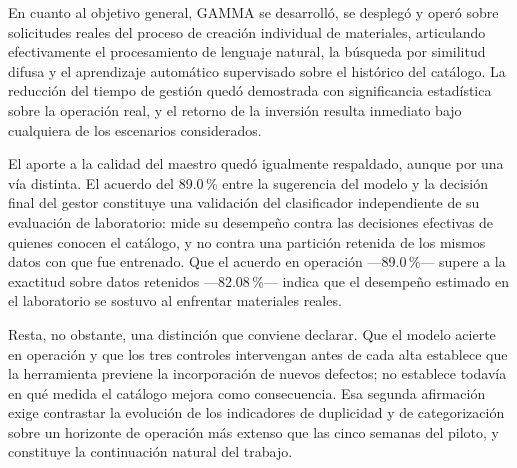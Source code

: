 En cuanto al objetivo general, GAMMA se desarrolló, se desplegó y operó sobre solicitudes reales del proceso de creación individual de materiales, articulando efectivamente el procesamiento de lenguaje natural, la búsqueda por similitud difusa y el aprendizaje automático supervisado sobre el histórico del catálogo. La reducción del tiempo de gestión quedó demostrada con significancia estadística sobre la operación real, y el retorno de la inversión resulta inmediato bajo cualquiera de los escenarios considerados.

El aporte a la calidad del maestro quedó igualmente respaldado, aunque por una vía distinta. El acuerdo del 89.0\,\% entre la sugerencia del modelo y la decisión final del gestor constituye una validación del clasificador independiente de su evaluación de laboratorio: mide su desempeño contra las decisiones efectivas de quienes conocen el catálogo, y no contra una partición retenida de los mismos datos con que fue entrenado. Que el acuerdo en operación —89.0\,\%— supere a la exactitud sobre datos retenidos —82.08\,\%— indica que el desempeño estimado en el laboratorio se sostuvo al enfrentar materiales reales.

Resta, no obstante, una distinción que conviene declarar. Que el modelo acierte en operación y que los tres controles intervengan antes de cada alta establece que la herramienta previene la incorporación de nuevos defectos; no establece todavía en qué medida el catálogo mejora como consecuencia. Esa segunda afirmación exige contrastar la evolución de los indicadores de duplicidad y de categorización sobre un horizonte de operación más extenso que las cinco semanas del piloto, y constituye la continuación natural del trabajo.
